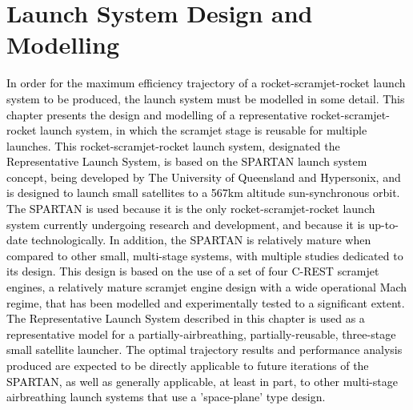 
\cleardoublepage
\chapter{Launch System Design and Modelling}\label{chapter:Design}

\textcolor{black}{
	In order for the maximum efficiency trajectory of a rocket-scramjet-rocket launch system to be produced, the launch system must be modelled in some detail.
	This chapter presents the design and modelling of a representative rocket-scramjet-rocket launch system, in which the scramjet stage is reusable for multiple launches. 
		This rocket-scramjet-rocket launch system, designated the Representative Launch System, is based on the SPARTAN launch system concept\cite{Preller2017b,Jazra2013}, being developed by The University of Queensland and Hypersonix\cite{Hypersonix}, and is designed to launch small satellites to a 567km altitude sun-synchronous orbit.
		The SPARTAN is used because it is the only rocket-scramjet-rocket launch system currently undergoing research and development, 
		 and because it is up-to-date technologically. In addition, the SPARTAN is relatively mature when compared to other small, multi-stage systems, with multiple studies dedicated to its design\cite{Preller2018,Jazra2013,Whitside2020}. This design is based on the use of a set of four C-REST scramjet engines, a relatively mature scramjet engine design with a wide operational Mach regime, that has been modelled and experimentally tested to a significant extent\cite{Whitside,Turner,Barth,Curran,Smart1999,Smart2006,Smart2009,Smart2009b,Smart2012,Suraweera2009}.   
	The Representative Launch System described in this chapter is used as a representative model for a partially-airbreathing, partially-reusable, three-stage small satellite launcher. The optimal trajectory results and performance analysis produced are expected to be directly applicable to future iterations of the SPARTAN, as well as generally applicable, at least in part, to other multi-stage airbreathing launch systems that use a 'space-plane' type design. }
	
